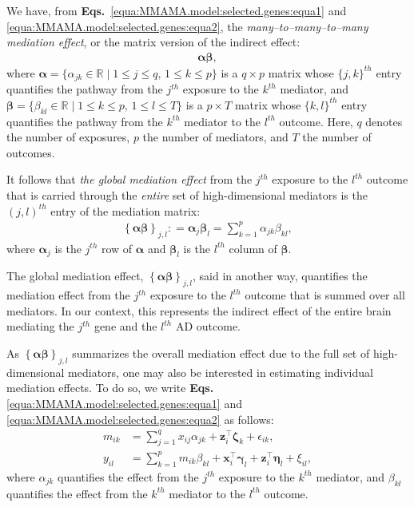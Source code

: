 \documentclass[
  12pt]{article}
\def\X{\mathbf{x}}
\def\Z{\mathbf{z}}
\begin{document}
We have, from \textbf{Eqs.}~\eqref{equa:MMAMA.model:selected.genes:equa1} and \eqref{equa:MMAMA.model:selected.genes:equa2}, the \textit{many--to--many--to--many mediation effect}, or the matrix version of the indirect effect:
{\setlength{\abovedisplayskip}{4pt}%
\setlength{\belowdisplayskip}{4pt}%
\setlength{\abovedisplayshortskip}{2pt}%
\setlength{\belowdisplayshortskip}{2pt}%
\begin{align}
	\bm{\alpha} \bm{\beta},
\end{align}}
where $\bm{\alpha} = \{ \alpha_{jk} \in \mathbb{R} \mid 1 \le j \le q, \, 1 \le k \le p \}$ is a $q \times p$ matrix whose $\{j, k\}^{th}$ entry quantifies the pathway from the $j^{th}$ exposure to the $k^{th}$ mediator, and
$\bm{\beta} = \{ \beta_{kl} \in \mathbb{R} \mid 1 \le k \le p, \, 1 \le l \le T \}$ is a $p \times T$ matrix whose $\{k, l\}^{th}$ entry quantifies the pathway from the $k^{th}$ mediator to the $l^{th}$ outcome. Here, $q$ denotes the number of exposures, $p$ the number of mediators, and $T$ the number of outcomes.

It follows that \textit{the global mediation effect} from the $j^{th}$ exposure to the $l^{th}$ outcome that is carried through the \textit{entire} set of high-dimensional mediators is the $(j,l)^{th}$ entry of the mediation matrix:
\begin{align}
	\left \{  \bm{\alpha} \bm{\beta} \right  \}_{j,l}: = \bm{\alpha}_j \bm{\beta}_l = \sum_{k = 1}^{p} \alpha_{jk}\beta_{kl},
\end{align}
where $\bm{\alpha}_j$ is the $j^{th}$ row of $\bm{\alpha}$ and $\bm{\beta}_l$ is the $l^{th}$ column of $\bm{\beta}$.

\noindent The global mediation effect, $\left \{\bm{\alpha} \bm{\beta} \right  \}_{j,l}$, said in another way, quantifies the mediation effect from the $j^{th}$ exposure to the $l^{th}$ outcome that is summed over all mediators. In our context, this represents the indirect effect of the entire brain mediating the $j^{th}$ gene and the $l^{th}$ AD outcome.

As $\left \{  \bm{\alpha} \bm{\beta} \right \}_{j,l}$ summarizes the overall mediation effect due to the full set of high-dimensional mediators, one may also be interested in estimating individual mediation effects. To do so, we write \textbf{Eqs.} \eqref{equa:MMAMA.model:selected.genes:equa1} and \eqref{equa:MMAMA.model:selected.genes:equa2} as follows:
\begin{align}
	m_{ik}
     \label{equa:MMAMA.model:selected.genes:equa3}
    &=
    \sum_{j=1}^q x_{ij} \alpha_{jk}
    +   \Z_{i}^{\top} \bm{\zeta}_{k}
    +   \epsilon_{ik}, \\ %
    y_{il}
    &=
	\label{equa:MMAMA.model:selected.genes:equa4}
    \sum_{k=1}^p m_{ik} \beta_{kl}
    +
      \X_{i}^{\top} \bm{\gamma}_{l}
    +
    \Z_{i}^{\top} \bm{\eta}_{l}
    +
    \xi_{il},
\end{align}
\noindent where $\alpha_{jk}$ quantifies the effect from the $j^{th}$ exposure to the $k^{th}$  mediator, and $\beta_{kl}$ quantifies the effect from the $k^{th}$ mediator to the $l^{th}$ outcome.
\end{document}
